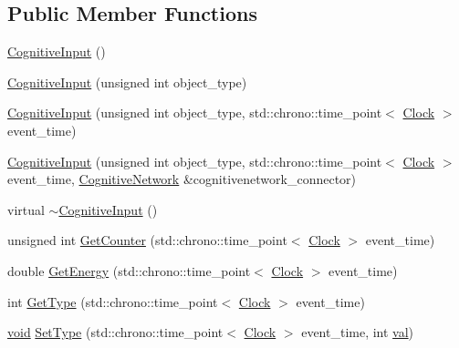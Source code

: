 \subsection*{Public Member Functions}
\begin{DoxyCompactItemize}
\item 
\mbox{\hyperlink{class_cognitive_input_a5c3c102dc3ec6cfec25eb849488e9782}{Cognitive\+Input}} ()
\item 
\mbox{\hyperlink{class_cognitive_input_a220c07f5be517afe47b4d3c486c4152e}{Cognitive\+Input}} (unsigned int object\+\_\+type)
\item 
\mbox{\hyperlink{class_cognitive_input_a31cc06426ab41c39ec8c795ab29d43de}{Cognitive\+Input}} (unsigned int object\+\_\+type, std\+::chrono\+::time\+\_\+point$<$ \mbox{\hyperlink{universe_8h_a0ef8d951d1ca5ab3cfaf7ab4c7a6fd80}{Clock}} $>$ event\+\_\+time)
\item 
\mbox{\hyperlink{class_cognitive_input_a230ebb8f019af7e0bff51c13bc10c580}{Cognitive\+Input}} (unsigned int object\+\_\+type, std\+::chrono\+::time\+\_\+point$<$ \mbox{\hyperlink{universe_8h_a0ef8d951d1ca5ab3cfaf7ab4c7a6fd80}{Clock}} $>$ event\+\_\+time, \mbox{\hyperlink{class_cognitive_network}{Cognitive\+Network}} \&cognitivenetwork\+\_\+connector)
\item 
virtual \mbox{\hyperlink{class_cognitive_input_a68007661b8fdd7ef39213a1fb3c06bd7}{$\sim$\+Cognitive\+Input}} ()
\item 
unsigned int \mbox{\hyperlink{class_cognitive_input_a695e7e57b717210b64f9e2c4e26c8044}{Get\+Counter}} (std\+::chrono\+::time\+\_\+point$<$ \mbox{\hyperlink{universe_8h_a0ef8d951d1ca5ab3cfaf7ab4c7a6fd80}{Clock}} $>$ event\+\_\+time)
\item 
double \mbox{\hyperlink{class_cognitive_input_a9bdb43198c1a36b97a6da125331bc927}{Get\+Energy}} (std\+::chrono\+::time\+\_\+point$<$ \mbox{\hyperlink{universe_8h_a0ef8d951d1ca5ab3cfaf7ab4c7a6fd80}{Clock}} $>$ event\+\_\+time)
\item 
int \mbox{\hyperlink{class_cognitive_input_a0ad0919c7280b268493b27892bd7c784}{Get\+Type}} (std\+::chrono\+::time\+\_\+point$<$ \mbox{\hyperlink{universe_8h_a0ef8d951d1ca5ab3cfaf7ab4c7a6fd80}{Clock}} $>$ event\+\_\+time)
\item 
\mbox{\hyperlink{glad_8h_a950fc91edb4504f62f1c577bf4727c29}{void}} \mbox{\hyperlink{class_cognitive_input_a37d38512fb190431b4baf8f990c077a9}{Set\+Type}} (std\+::chrono\+::time\+\_\+point$<$ \mbox{\hyperlink{universe_8h_a0ef8d951d1ca5ab3cfaf7ab4c7a6fd80}{Clock}} $>$ event\+\_\+time, int \mbox{\hyperlink{glad_8h_a26942fd2ed566ef553eae82d2c109c8f}{val}})

\end{DoxyCompactItemize}
